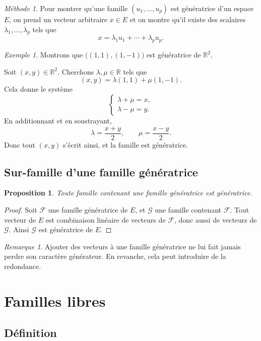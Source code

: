 \documentclass[11pt,a4paper]{article}
\newtheorem{proposition}[definition]{Proposition}
\theoremstyle{remark}
\newtheorem{remarque}[definition]{Remarque}
\newtheorem{exemple}[definition]{Exemple}
\newtheorem*{methode}{Méthode}
\newcommand{\R}{\mathbb{R}}
\begin{document}
\begin{methode}
Pour montrer qu’une famille \((u_1,\dots,u_p)\) est génératrice d’un espace \(E\), on prend un vecteur arbitraire \(x\in E\) et on montre qu’il existe des scalaires \(\lambda_1,\dots,\lambda_p\) tels que
\[
x=\lambda_1u_1+\cdots+\lambda_pu_p.
\]
\end{methode}

\begin{exemple}
Montrons que \(\big((1,1),(1,-1)\big)\) est génératrice de \(\R^2\).

Soit \((x,y)\in\R^2\). Cherchons \(\lambda,\mu\in\R\) tels que
\[
(x,y)=\lambda(1,1)+\mu(1,-1).
\]
Cela donne le système
\[
\begin{cases}
\lambda+\mu=x,\\
\lambda-\mu=y.
\end{cases}
\]
En additionnant et en soustrayant,
\[
\lambda=\frac{x+y}{2},
\qquad
\mu=\frac{x-y}{2}.
\]
Donc tout \((x,y)\) s’écrit ainsi, et la famille est génératrice.
\end{exemple}

\subsection{Sur-famille d’une famille génératrice}

\begin{proposition}
Toute famille contenant une famille génératrice est génératrice.
\end{proposition}

\begin{proof}
Soit \(\mathcal{F}\) une famille génératrice de \(E\), et \(\mathcal{G}\) une famille contenant \(\mathcal{F}\).  
Tout vecteur de \(E\) est combinaison linéaire de vecteurs de \(\mathcal{F}\), donc aussi de vecteurs de \(\mathcal{G}\). Ainsi \(\mathcal{G}\) est génératrice de \(E\).
\end{proof}

\begin{remarque}
Ajouter des vecteurs à une famille génératrice ne lui fait jamais perdre son caractère générateur. En revanche, cela peut introduire de la redondance.
\end{remarque}

\section{Familles libres}

\subsection{Définition}
\end{document}
